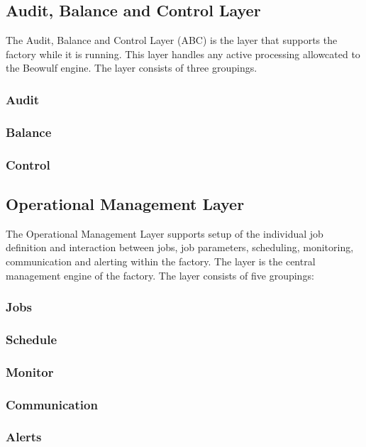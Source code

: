 \documentclass{sigplanconf}
\begin{document}
\subsection{Audit, Balance and Control Layer}
The Audit, Balance and Control Layer (ABC) is the layer that supports the factory while it is running.
This layer handles any active processing allowcated to the Beowulf engine. The layer consists of three groupings.
\subsubsection{Audit}

\subsubsection{Balance}

\subsubsection{Control}

\subsection{Operational Management Layer}
The Operational Management Layer supports setup of the individual job definition and 
interaction between jobs, job parameters, scheduling, monitoring, communication and alerting within the factory. The layer is the central management engine of the factory. The layer consists of five groupings:
\subsubsection{Jobs}

\subsubsection{Schedule}

\subsubsection{Monitor}

\subsubsection{Communication}

\subsubsection{Alerts}
\end{document}
